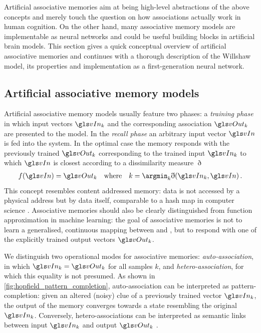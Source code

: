 Artificial associative memories aim at being high-level abstractions of the above concepts and merely touch the question on how associations actually work in human cognition. On the other hand, many associative memory models are implementable as neural networks and could be useful building blocks in artificial brain models. This section gives a quick conceptual overview of artificial associative memories and continues with a thorough description of the Willshaw model, its properties and implementation as a first-generation neural network.

\subsection{Artificial associative memory models}

Artificial associative memory models usually feature two phases: a \emph{training phase} in which input vectors $\vIn_k$ and the corresponding association $\vOut_k$ are presented to the model. In the \emph{recall phase} an arbitrary input vector $\vIn$ is fed into the system. In the optimal case the memory responds with the previously trained $\vOut_k$ corresponding to the trained input $\vIn_k$ to which $\vIn$ is closest according to a dissimilarity measure $\eth$
\begin{align}
	f(\vIn) = \vOut_k \quad \text{where} \quad k = \argmin_{k} \eth(\vIn_k, \vIn) \,.
	\label{eqn:associative_memory}
\end{align}
This concept resembles content addressed memory: data is not accessed by a physical address but by data itself, comparable to a hash map in computer science \cite{kohonen2012content}. Associative memories should also be clearly distinguished from function approximation in machine learning: the goal of associative memories is not to learn a generalised, continuous mapping between \vIn and \vOut, but to respond with one of the explicitly trained output vectors $\vOut_k$.

We distinguish two operational modes for associative memories: \emph{auto-association}, in which $\vIn_k = \vOut_k$ for all samples $k$, and \emph{hetero-association}, for which this equality is not presumed. As shown in \cref{fig:hopfield_pattern_completion}, auto-association can be interpreted as pattern-completion: given an altered (noisy) clue \vIn of a previously trained vector $\vIn_k$, the output of the memory converges towards a state resembling the original $\vIn_k$. Conversely, hetero-associations can be interpreted as semantic links between input $\vIn_k$ and output $\vOut_k$ \cite{palm2013neural}.

